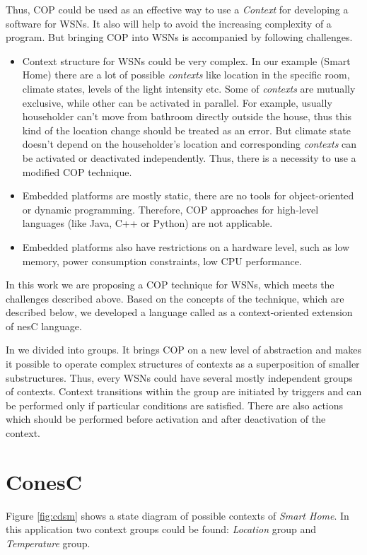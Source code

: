 \documentclass{ubicomp-ext}
\begin{document}
Thus, COP could be used as an effective way to use a \textit{Context} for developing a software for WSNs. It also will help to avoid the increasing complexity of a program. But bringing COP into WSNs is accompanied by following challenges.
\begin{itemize}\compresslist
\item
Context structure for WSNs could be very complex. In our example (Smart Home) there are a lot of possible \textit{contexts} like location in the specific room, climate states, levels of the light intensity etc. Some of \textit{contexts} are mutually exclusive, while other can be activated in parallel. For example, usually householder can't move from bathroom directly outside the house, thus this kind of the location change should be treated as an error. But climate state doesn't depend on the householder's location and corresponding \textit{contexts} can be activated or deactivated independently. Thus, there is a necessity to use a modified COP technique.
\item
Embedded platforms are mostly static, there are no tools for object-oriented or dynamic programming. Therefore, COP approaches for high-level languages (like Java, C++ or Python) are not applicable. 
\item
Embedded platforms also have restrictions on a hardware level, such as low memory, power consumption constraints, low CPU performance.
\end{itemize}

In this work we are proposing a COP technique for WSNs, which meets the challenges described above. Based on the concepts of the technique, which are described below, we developed a language called {} as a context-oriented extension of nesC language.

In {} we divided into groups. It brings COP on a new level of abstraction and makes it possible to operate complex structures of contexts as a superposition of smaller substructures. Thus, every WSNs could have several mostly independent groups of contexts. Context transitions within the group are initiated by triggers and can be performed only if particular conditions are satisfied. There are also actions which should be performed before activation and after deactivation of the context.
\section{ConesC}
Figure \ref{fig:cdsm} shows a state diagram of possible contexts of \textit{Smart Home}. In this application two context groups could be found: \textit{Location} group and \textit{Temperature} group.
\end{document}
